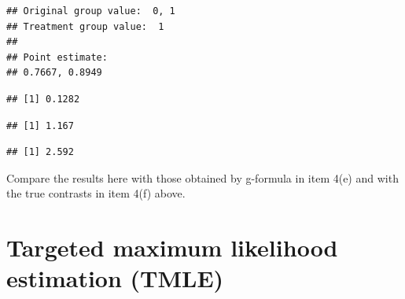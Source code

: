 \documentclass[
]{book}
\newenvironment{Shaded}{\begin{snugshade}}{\end{snugshade}}
\newcommand{\AttributeTok}[1]{\textcolor[rgb]{0.13,0.29,0.53}{#1}}
\newcommand{\DecValTok}[1]{\textcolor[rgb]{0.00,0.00,0.81}{#1}}
\newcommand{\FunctionTok}[1]{\textcolor[rgb]{0.13,0.29,0.53}{\textbf{#1}}}
\newcommand{\NormalTok}[1]{#1}
\newcommand{\SpecialCharTok}[1]{\textcolor[rgb]{0.81,0.36,0.00}{\textbf{#1}}}
\newcommand{\StringTok}[1]{\textcolor[rgb]{0.31,0.60,0.02}{#1}}
\begin{document}
\begin{verbatim}
## Original group value:  0, 1 
## Treatment group value:  1 
## 
## Point estimate: 
## 0.7667, 0.8949
\end{verbatim}

\begin{Shaded}
\end{Shaded}

\begin{verbatim}
## [1] 0.1282
\end{verbatim}

\begin{Shaded}
\end{Shaded}

\begin{verbatim}
## [1] 1.167
\end{verbatim}

\begin{Shaded}
\end{Shaded}

\begin{verbatim}
## [1] 2.592
\end{verbatim}

Compare the results here with those obtained by g-formula in item 4(e)
and with the true contrasts in item 4(f) above.

\section{Targeted maximum likelihood estimation (TMLE)}\label{targeted-maximum-likelihood-estimation-tmle}
\end{document}
